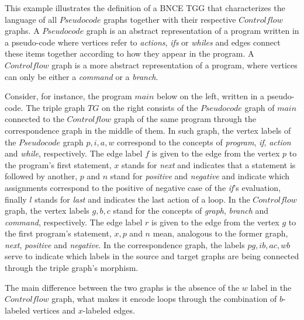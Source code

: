 \documentclass[runningheads]{llncs}
\begin{document}
\begin{example}
	\label{ex:pseudocode2controlflow}
	This example illustrates the definition of a BNCE TGG that characterizes the language of all $Pseudocode$ graphs together with their respective $Controlflow$ graphs. A $Pseudocode$ graph is an abstract representation of a program written in a pseudo-code where vertices refer to \textit{actions}, \textit{ifs} or \textit{whiles} and edges connect these items together according to how they appear in the program. A $Controlflow$ graph is a more abstract representation of a program, where vertices can only be either a \textit{command} or a \textit{branch}.
	
	Consider, for instance, the program $main$ below on the left, written in a pseudo-code. The triple graph $TG$ on the right consists of the $Pseudocode$ graph of $main$ connected to the $Controlflow$ graph of the same program through the correspondence graph in the middle of them. In such graph, the vertex labels of the $Pseudocode$ graph $p, i, a, w$ correspond to the concepts of \textit{program}, \textit{if}, \textit{action} and \textit{while}, respectively. The edge label $f$ is given to the edge from the vertex $p$ to the program's first statement, $x$ stands for \textit{next} and indicates that a statement is followed by another, $p$ and $n$ stand for \textit{positive} and \textit{negative} and indicate which assignments correspond to the positive of negative case of the \textit{if}'s evaluation, finally $l$ stands for \textit{last} and indicates the last action of a loop. In the $Controlflow$ graph, the vertex labels $g, b, c$ stand for the concepts of \textit{graph}, \textit{branch} and \textit{command}, respectively. The edge label $r$ is given to the edge from the vertex $g$ to the first program's statement, $x, p$ and $n$ mean, analogous to the former graph, \textit{next}, \textit{positive} and \textit{negative}. In the correspondence graph, the labels $pg, ib, ac, wb$ serve to indicate which labels in the source and target graphs are being connected through the triple graph's morphism.
	
	The main difference between the two graphs is the absence of the $w$ label in the $Controlflow$ graph, what makes it encode loops through the combination of $b$-labeled vertices and $x$-labeled edges.
	

\end{example}
\end{document}
